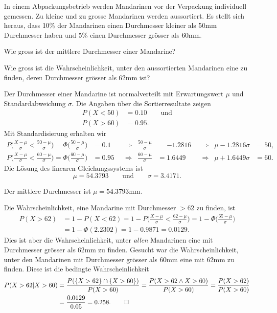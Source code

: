 In einem Abpackungsbetrieb werden Mandarinen vor der Verpackung
individuell gemessen.
Zu kleine und zu grosse Mandarinen werden aussortiert.
Es stellt sich heraus, dass 10\% der Mandarinen einen Durchmesser
kleiner als 50mm Durchmesser haben und 5\% einen Durchmesser grösser als 60mm.
\begin{teilaufgaben}
\item
Wie gross ist der mittlere Durchmesser einer Mandarine?
\item
Wie gross ist die Wahrscheinlichkeit, unter den aussortierten 
Mandarinen eine zu finden, deren Durchmesser grösser als 62mm ist?
\end{teilaufgaben}


\begin{loesung}
Der Durchmesser einer Mandarine ist normalverteilt mit Erwartungswert
$\mu$ und Standardabweichung $\sigma$.
Die Angaben über die Sortierresultate zeigen
\begin{align*}
P(X<50) &= 0.10 \qquad\text{und}\\
P(X>60) &= 0.95.
\end{align*}
Mit Standardisierung erhalten wir
\begin{align*}
P\biggl(\frac{X-\mu}{\sigma} < \frac{50-\mu}{\sigma}\biggr)
=
\Phi\biggl(\frac{50-\mu}{\sigma}\biggr)
&= 0.1
&&\Rightarrow&
\frac{50-\mu}{\sigma} 
&=
-1.2816
&&\Rightarrow&
\mu
-1.2816\sigma&=
50,
\\
P\biggl(\frac{X-\mu}{\sigma} < \frac{60-\mu}{\sigma}\biggr)
=
\Phi\biggl(\frac{60-\mu}{\sigma}\biggr)
&= 0.95
&&\Rightarrow&
\frac{60-\mu}{\sigma}
&=
1.6449
&&\Rightarrow&
\mu+1.6449\sigma
&=
60.
\end{align*}
Die Lösung des linearen Gleichungssystems ist
\[
\mu = 54.3793
\qquad\text{und}\qquad
\sigma = 3.4171.
\]
\begin{teilaufgaben}
\item
Der mittlere Durchmesser ist $\mu=54.3793\text{mm}$.
\item
Die Wahrscheinlichkeit, eine Mandarine mit Durchmesser $>62$ 
zu finden, ist
\begin{align*}
P(X>62)
&=
1-P(X<62)
=
1-P\biggl(\frac{X-\mu}{\sigma} < \frac{62-\mu}{\sigma}\biggr)
=
1-\Phi\biggl(\frac{65-\mu}{\sigma}\biggr)
\\
&=
1-\Phi(2.2302)
=
1-0.9871
=
0.0129.
\end{align*}
Dies ist aber die Wahrscheinlichkeit, unter {\em allen} Mandarinen
eine mit Durchmesser grösser als 62mm zu finden.
Gesucht war die Wahrscheinlichkeit, unter den Mandarinen mit
Durchmesser grösser als 60mm eine mit 62mm zu finden.
Diese ist die bedingte Wahrscheinlichkeit
\begin{align*}
P(X > 62 | X > 60)
&=
\frac{P(\{X>62\}\cap\{X>60\})}{P(X>60)}
=
\frac{P(X>62\wedge X>60)}{P(X>60)}
=
\frac{P(X>62)}{P(X>60)}
\\
&=
\frac{0.0129}{0.05}
=
0.258.
\qedhere
\end{align*}
\end{teilaufgaben}
\end{loesung}

